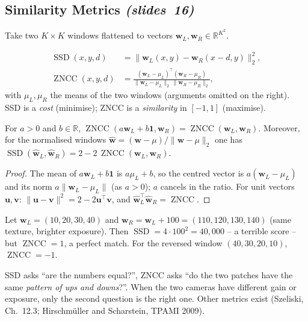 \documentclass[11pt,a4paper]{article}
\newcommand{\slr}[1]{\texorpdfstring{\emph{(slides~#1)}}{(slides #1)}}
\newcommand{\wL}{\bm{w}_L}
\newcommand{\wR}{\bm{w}_R}
\newcommand{\norm}[1]{\lVert #1\rVert}
\DeclareMathOperator{\SSD}{SSD}
\DeclareMathOperator{\ZNCC}{ZNCC}
\theoremstyle{definition}
\begin{document}
\subsection{Similarity Metrics \slr{16}}
Take two $K\times K$ windows flattened to vectors $\wL,\wR\in\mathbb R^{K^2}$.
\begin{Definition}
\begin{align*}
\SSD(x,y,d)&=\norm{\wL(x,y)-\wR(x-d,y)}_2^2,\\
\ZNCC(x,y,d)&=\frac{(\wL-\mu_L)^{\top}(\wR-\mu_R)}{\norm{\wL-\mu_L}_2\,\norm{\wR-\mu_R}_2},
\end{align*}
with $\mu_L,\mu_R$ the means of the two windows (arguments omitted on the right). SSD is a \emph{cost} (minimise); ZNCC is a \emph{similarity} in $[-1,1]$ (maximise).
\end{Definition}
\begin{Lemma}\label{lem:zncc}
For $a>0$ and $b\in\mathbb R$, $\ZNCC(a\wL+b\bm 1,\wR)=\ZNCC(\wL,\wR)$. Moreover, for the normalised windows $\hat{\bm w}=(\bm w-\mu)/\norm{\bm w-\mu}_2$ one has $\SSD(\hat{\bm w}_L,\hat{\bm w}_R)=2-2\,\ZNCC(\wL,\wR)$.
\end{Lemma}
\begin{proof}
The mean of $a\wL+b\bm1$ is $a\mu_L+b$, so the centred vector is $a(\wL-\mu_L)$ and its norm $a\norm{\wL-\mu_L}$ (as $a>0$); $a$ cancels in the ratio. For unit vectors $\bm u,\bm v$: $\norm{\bm u-\bm v}^2=2-2\bm u^{\top}\bm v$, and $\hat{\bm w}_L^{\top}\hat{\bm w}_R=\ZNCC$.
\end{proof}
\begin{Example}
Let $\wL=(10,20,30,40)$ and $\wR=\wL+100=(110,120,130,140)$ (same texture, brighter exposure). Then $\SSD=4\cdot100^2=40{,}000$ -- a terrible score -- but $\ZNCC=1$, a perfect match. For the reversed window $(40,30,20,10)$, $\ZNCC=-1$.
\end{Example}
\begin{intuition}
SSD asks ``are the numbers equal?'', ZNCC asks ``do the two patches have the same \emph{pattern of ups and downs}?''. When the two cameras have different gain or exposure, only the second question is the right one. Other metrics exist (Szeliski, Ch.~12.3; Hirschm\"uller and Scharstein, TPAMI 2009).
\end{intuition}
\end{document}
